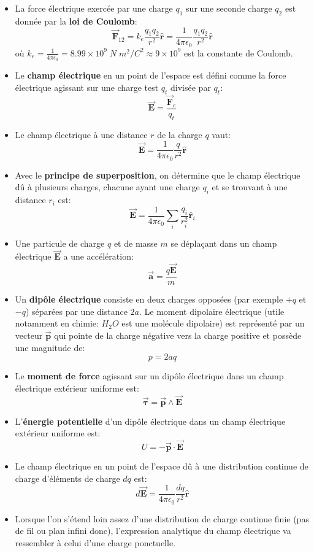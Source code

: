 \documentclass[a4paper]{article}
\begin{document}
\begin{itemize}
    \item La force électrique exercée par une charge $ q_1 $ sur une seconde charge $ q_2 $ est donnée par la \textbf{loi de Coulomb}:
\[ \vec{\textbf{F}}_{12} = k_e \frac{q_1 q_2}{r^2} \hat{\textbf{r}} = \frac{1}{4 \pi \epsilon_0} \frac{q_1 q_2}{r^2} \hat{\textbf{r}} \]
où $\displaystyle k_e = \frac{1}{4 \pi \epsilon_0} = 8.99 \times 10^9 \; N \; m^2/C^2 \approx 9\times 10^9 $ est la constante de Coulomb.
    \item Le \textbf{champ électrique} en un point de l'espace est défini comme la force électrique agissant sur une charge test $ q_t $
divisée par $ q_t $: 
\[ \vec{\textbf{E}} = \frac{\vec{\textbf{F}}_e}{q_t} \]
    \item Le champ électrique à une distance $ r $ de la charge $ q $ vaut:
\[ \vec{\textbf{E}} = \frac{1}{4 \pi \epsilon_0} \frac{q}{r^2} \hat{\textbf{r}} \]
    \item Avec le \textbf{principe de superposition}, on détermine que le champ électrique dû à plusieurs charges, chacune ayant une 
charge $ q_i $ et se trouvant à une distance $ r_i $ est: 
\[ \vec{\textbf{E}} = \frac{1}{4 \pi \epsilon_0} \sum_i \frac{q_i}{r_i^2} \hat{\textbf{r}}_i \]
    \item Une particule de charge $ q $ et de masse $ m $ se déplaçant dans un champ électrique $ \vec{\textbf{E}} $ a une accélération: 
\[ \vec{\textbf{a}} = \frac{q \vec{\textbf{E}}}{m} \]
    \item Un \textbf{dipôle électrique} consiste en deux charges opposées (par exemple $ +q $ et $ -q $) séparées par une distance $2 a$.
Le moment dipolaire électrique (utile notamment en chimie: $ H_2 O $ est une molécule dipolaire) est représenté par un vecteur $ \vec{\textbf{p}} $ qui pointe de la charge négative vers la charge positive et possède une magnitude de: 
\[ p = 2 a q \]
    \item Le \textbf{moment de force} agissant sur un dipôle électrique dans un champ électrique extérieur uniforme est: 
\[ \vec{\boldsymbol{\tau}} = \vec{\textbf{p}} \wedge \vec{\textbf{E}} \]
    \item L'\textbf{énergie potentielle} d'un dipôle électrique dans un champ électrique extérieur uniforme est: 
\[ U = - \vec{\textbf{p}} \cdot \vec{\textbf{E}} \]
    \item Le champ électrique en un point de l'espace dû à une distribution continue de charge d'éléments de charge $ d q $ est: 
\[ d \vec{\textbf{E}} = \frac{1}{4 \pi \epsilon_0} \frac{d q}{r^2} \hat{\textbf{r}} \]
    \item Lorsque l'on s'étend loin assez d'une distribution de charge continue finie (pas de fil ou plan infini donc), l'expression analytique du champ électrique va ressembler à celui d'une charge ponctuelle.
\end{itemize}
\end{document}
